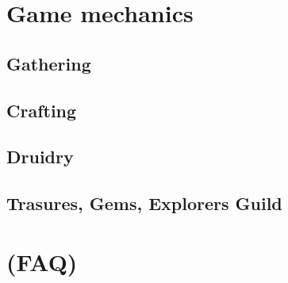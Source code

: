 \documentclass[a4paper,11pt]{scrreprt}
\begin{document}
\section{}

\chapter{Game mechanics}
\section{Gathering}
\section{Crafting}
\section{Druidry}
\section{Trasures, Gems, Explorers Guild}

\chapter{(FAQ)}
\end{document}
